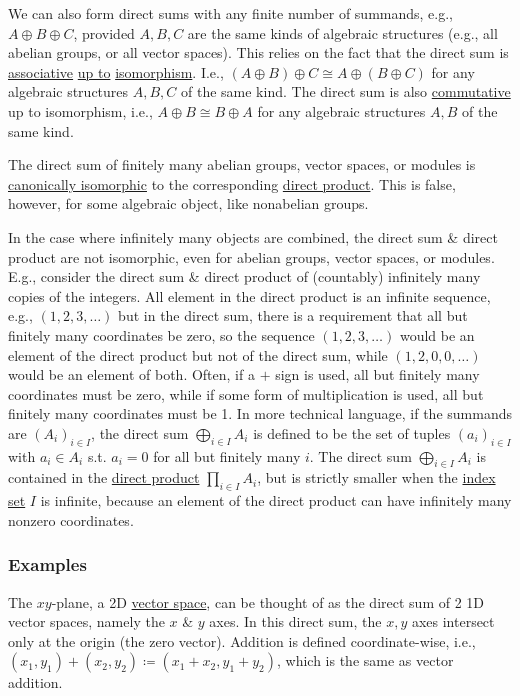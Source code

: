 \documentclass{article}
\begin{document}
We can also form direct sums with any finite number of summands, e.g., $A\oplus B\oplus C$, provided $A,B,C$ are the same kinds of algebraic structures (e.g., all abelian groups, or all vector spaces). This relies on the fact that the direct sum is \href{https://en.wikipedia.org/wiki/Associative}{associative} \href{https://en.wikipedia.org/wiki/Up_to}{up to} \href{https://en.wikipedia.org/wiki/Isomorphism}{isomorphism}. I.e., $(A\oplus B)\oplus C\cong A\oplus(B\oplus C)$ for any algebraic structures $A,B,C$ of the same kind. The direct sum is also \href{https://en.wikipedia.org/wiki/Commutative}{commutative} up to isomorphism, i.e., $A\oplus B\cong B\oplus A$ for any algebraic structures $A,B$ of the same kind.

The direct sum of finitely many abelian groups, vector spaces, or modules is \href{https://en.wikipedia.org/wiki/Isomorphism}{canonically isomorphic} to the corresponding \href{https://en.wikipedia.org/wiki/Direct_product}{direct product}. This is false, however, for some algebraic object, like nonabelian groups.

In the case where infinitely many objects are combined, the direct sum \& direct product are not isomorphic, even for abelian groups, vector spaces, or modules. E.g., consider the direct sum \& direct product of (countably) infinitely many copies of the integers. All element in the direct product is an infinite sequence, e.g., $(1,2,3,\ldots)$ but in the direct sum, there is a requirement that all but finitely many coordinates be zero, so the sequence $(1,2,3,\ldots)$ would be an element of the direct product but not of the direct sum, while $(1,2,0,0,\ldots)$ would be an element of both. Often, if a $+$ sign is used, all but finitely many coordinates must be zero, while if some form of multiplication is used, all but finitely many coordinates must be 1. In more technical language, if the summands are $(A_i) _{i\in I}$, the direct sum $\bigoplus_{i\in I} A_i$ is defined to be the set of tuples $(a_i)_{i\in I}$ with $a_i\in A_i$ s.t. $a_i = 0$ for all but finitely many $i$. The direct sum $\bigoplus_{i\in I} A_i$ is contained in the \href{https://en.wikipedia.org/wiki/Direct_product}{direct product} $\prod_{i\in I} A_i$, but is strictly smaller when the \href{https://en.wikipedia.org/wiki/Index_set}{index set} $I$ is infinite, because an element of the direct product can have infinitely many nonzero coordinates.

\subsubsection{Examples}
The $xy$-plane, a 2D \href{https://en.wikipedia.org/wiki/Vector_space}{vector space}, can be thought of as the direct sum of 2 1D vector spaces, namely the $x$ \& $y$ axes. In this direct sum, the $x,y$ axes intersect only at the origin (the zero vector). Addition is defined coordinate-wise, i.e., $(x_1,y_1) + (x_2,y_2)\coloneqq(x_1 + x_2,y_1 + y_2)$, which is the same as vector addition.
\end{document}
